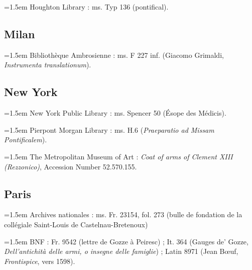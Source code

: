 \documentclass[12pt,twoside,openany]{book}
\newenvironment{PurhBibliography}
  {%
    \par
    \setlength{\parindent}{0pt}%
    \setlength{\leftskip}{0pt}%
  }
  {%
    \par
  }
\begin{document}
\begin{PurhBibliography}
\noindent\hangindent=1.5em Houghton Library : ms. Typ 136 (pontifical).\par
\end{PurhBibliography}

\subsection{Milan}

\begin{PurhBibliography}
\noindent\hangindent=1.5em Bibliothèque Ambrosienne : ms. F 227 inf. (Giacomo Grimaldi, \textit{Instrumenta translationum}).\par
\end{PurhBibliography}

\subsection{New York}

\begin{PurhBibliography}
\noindent\hangindent=1.5em New York Public Library : ms. Spencer 50 (Ésope des Médicis).\par
\noindent\hangindent=1.5em Pierpont Morgan Library : ms. H.6 (\textit{Praeparatio ad Missam Pontificalem}).\par
\noindent\hangindent=1.5em The Metropolitan Museum of Art : \textit{Coat of arms of Clement XIII (Rezzonico)}, Accession Number 52.570.155.\par
\end{PurhBibliography}

\subsection{Paris}

\begin{PurhBibliography}
\noindent\hangindent=1.5em Archives nationales : ms. Fr. 23154, fol. 273 (bulle de fondation de la collégiale Saint-Louis de Castelnau-Bretenoux)\par
\noindent\hangindent=1.5em BNF : Fr. 9542 (lettre de Gozze à Peiresc) ; It. 364 (Gauges de’ Gozze, \textit{Dell’antichità delle armi, o insegne delle famiglie}) ; Latin 8971 (Jean Bœuf, \textit{Frontispice}, vers 1598).\par
\end{PurhBibliography}
\end{document}
